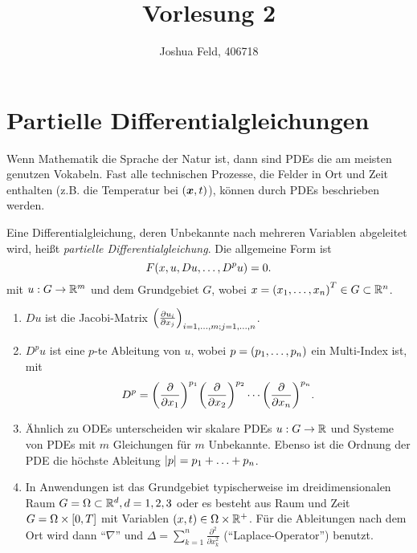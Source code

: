 \documentclass{lecture}
\institute{Applied and Computational Mathematics}
\title{Vorlesung 2}
\author{Joshua Feld, 406718}
\begin{document}
    \maketitle


    \section*{Partielle Differentialgleichungen}

    Wenn Mathematik die Sprache der Natur ist, dann sind PDEs die am meisten genutzen Vokabeln.
    Fast alle technischen Prozesse, die Felder in Ort und Zeit enthalten (z.B. die Temperatur bei \(\parentheses*{\bm{x}, t}\)), können durch PDEs beschrieben werden.
    \begin{definition}
        Eine Differentialgleichung, deren Unbekannte nach mehreren Variablen abgeleitet wird, heißt \emph{partielle Differentialgleichung}.
        Die allgemeine Form ist
        \[
            F\parentheses*{x, u, Du, \ldots, D^p u} = 0.
        \]
        mit \(u: G \to \R^m\) und dem Grundgebiet \(G\), wobei \(x = \parentheses*{x_1, \ldots, x_n}^T \in G \subset \R^n\).
    \end{definition}
    \begin{remark}
        \begin{enumerate}
            \item \(Du\) ist die Jacobi-Matrix \(\parentheses*{\frac{\partial u_i}{\partial x_j}}_{i = 1, \ldots, m; j = 1, \ldots, n}\).
            \item \(D^p u\) ist eine \(p\)-te Ableitung von \(u\), wobei \(p = \parentheses*{p_1, \ldots, p_n}\) ein Multi-Index ist, mit
            \[
                D^p = \parentheses*{\frac{\partial}{\partial x_1}}^{p_1}\parentheses*{\frac{\partial}{\partial x_2}}^{p_2}\cdots\parentheses*{\frac{\partial}{\partial x_n}}^{p_n}.
            \]
            \item Ähnlich zu ODEs unterscheiden wir skalare PDEs \(u: G \to \R\) und Systeme von PDEs mit \(m\) Gleichungen für \(m\) Unbekannte.
            Ebenso ist die Ordnung der PDE die höchste Ableitung \(\absolute*{p} = p_1 + \ldots + p_n\).
            \item In Anwendungen ist das Grundgebiet typischerweise im dreidimensionalen Raum \(G = \Omega \subset \R^d, d = 1, 2, 3\) oder es besteht aus Raum und Zeit \(G = \Omega \times \brackets*{0, T}\) mit Variablen \(\parentheses*{x, t} \in \Omega \times \R^+\).
            Für die Ableitungen nach dem Ort wird dann ``\(\nabla\)'' und \(\Delta = \sum_{k = 1}^n \frac{\partial^2}{\partial x_k^2}\) (``Laplace-Operator'') benutzt.
        \end{enumerate}
    \end{remark}
\end{document}
